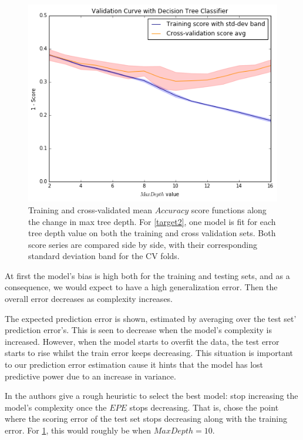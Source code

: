 \begin{figure}[h!]
\begin{center}
\includegraphics[width=1\columnwidth]{figures/figure-biasVariance/dtree_overfit_problem_2.png}
\caption{ Training and cross-validated mean $Accuracy$ score functions along the change in max tree depth.
For \cref{target2}, one model is fit for each tree depth value on both the training and cross validation sets.
Both score series are compared side by side, with their corresponding standard deviation band for the CV folds.}
\label{figure:dtree_overfit_problem_2}
\end{center}
\end{figure}


At first the model's bias is high both for the training and testing sets, and as a consequence, we would expect to have a high generalization error.
Then the overall error decreases as complexity increases.

The expected prediction error is shown, estimated by averaging over the test set' prediction error's.
This is seen to decrease when the model's complexity is increased.
However, when the model starts to overfit the data, the test error starts to rise whilst the train error keeps decreasing.
This situation is important to our prediction error estimation cause it hints that the model has lost predictive power due to an increase in variance.

In \protect\textcite{hastie-elemstatslearn} the authors give a rough heuristic to select the best model: stop increasing the model's complexity once the $EPE$ stops decreasing.
That is, chose the point where the scoring error of the test set stops decreasing along with the training error.
For \cref{figure:dtree_overfit_problem_2}, this would roughly be when $Max Depth = 10$.

